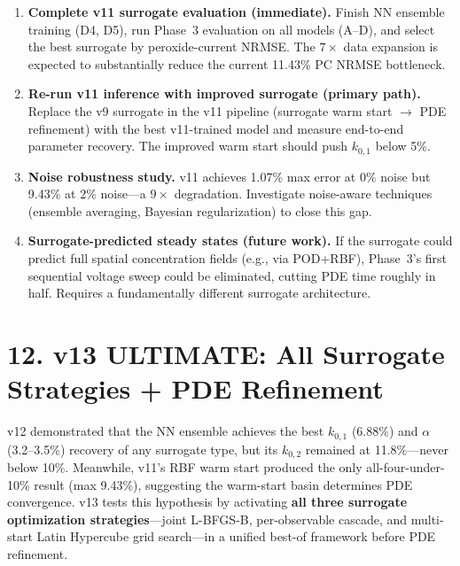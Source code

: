\documentclass[11pt]{article}
\begin{document}
\begin{enumerate}
  \item \textbf{Complete v11 surrogate evaluation (immediate).}
        Finish NN ensemble training (D4, D5), run Phase~3 evaluation on
        all models (A--D), and select the best surrogate by peroxide-current
        NRMSE.  The $7\times$ data expansion is expected to substantially
        reduce the current 11.43\% PC NRMSE bottleneck.

  \item \textbf{Re-run v11 inference with improved surrogate (primary path).}
        Replace the v9 surrogate in the v11 pipeline (surrogate warm start
        $\to$ PDE refinement) with the best v11-trained model and measure
        end-to-end parameter recovery.  The improved warm start should
        push $k_{0,1}$ below 5\%.

  \item \textbf{Noise robustness study.}
        v11 achieves 1.07\% max error at $0\%$ noise but 9.43\% at $2\%$
        noise---a $9\times$ degradation.  Investigate noise-aware techniques
        (ensemble averaging, Bayesian regularization) to close this gap.

  \item \textbf{Surrogate-predicted steady states (future work).}
        If the surrogate could predict full spatial concentration fields
        (e.g., via POD+RBF), Phase~3's first sequential voltage sweep could
        be eliminated, cutting PDE time roughly in half.  Requires a
        fundamentally different surrogate architecture.
\end{enumerate}


\section*{12. v13 ULTIMATE: All Surrogate Strategies + PDE Refinement}\label{sec:v13}

v12 demonstrated that the NN ensemble achieves the best $k_{0,1}$ (6.88\%) and
$\alpha$ (3.2--3.5\%) recovery of any surrogate type, but its $k_{0,2}$
remained at 11.8\%---never below 10\%.  Meanwhile, v11's RBF warm start
produced the only all-four-under-10\% result (max 9.43\%), suggesting the
warm-start basin determines PDE convergence.  v13 tests this hypothesis by
activating \textbf{all three surrogate optimization strategies}---joint
L-BFGS-B, per-observable cascade, and multi-start Latin Hypercube grid
search---in a unified best-of framework before PDE refinement.
\end{document}
